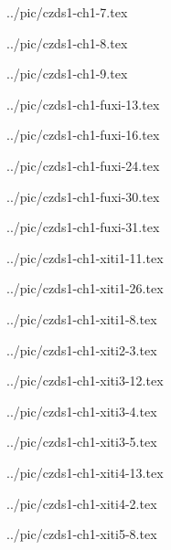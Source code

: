 

../pic/czds1-ch1-7.tex



../pic/czds1-ch1-8.tex



../pic/czds1-ch1-9.tex



../pic/czds1-ch1-fuxi-13.tex



../pic/czds1-ch1-fuxi-16.tex



../pic/czds1-ch1-fuxi-24.tex



../pic/czds1-ch1-fuxi-30.tex



../pic/czds1-ch1-fuxi-31.tex



../pic/czds1-ch1-xiti1-11.tex



../pic/czds1-ch1-xiti1-26.tex



../pic/czds1-ch1-xiti1-8.tex



../pic/czds1-ch1-xiti2-3.tex



../pic/czds1-ch1-xiti3-12.tex



../pic/czds1-ch1-xiti3-4.tex



../pic/czds1-ch1-xiti3-5.tex



../pic/czds1-ch1-xiti4-13.tex



../pic/czds1-ch1-xiti4-2.tex



../pic/czds1-ch1-xiti5-8.tex

